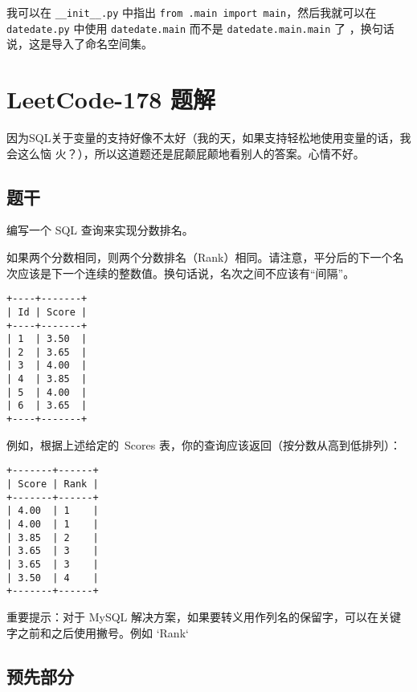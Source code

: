 我可以在 \verb|__init__.py| 中指出 \verb|from .main import main|，然后我就可以在 %
\verb|datedate.py| 中使用 \verb|datedate.main| 而不是 \verb|datedate.main.main| 了
，换句话说，这是导入了命名空间集。


\section{LeetCode-178 题解}

因为SQL关于变量的支持好像不太好（我的天，如果支持轻松地使用变量的话，我会这么恼
火？），所以这道题还是屁颠屁颠地看别人的答案。心情不好。

\subsection{题干}

编写一个 SQL 查询来实现分数排名。

如果两个分数相同，则两个分数排名（Rank）相同。请注意，平分后的下一个名次应该是下一个连续的整数值。换句话说，名次之间不应该有“间隔”。
\begin{lstlisting}
+----+-------+
| Id | Score |
+----+-------+
| 1  | 3.50  |
| 2  | 3.65  |
| 3  | 4.00  |
| 4  | 3.85  |
| 5  | 4.00  |
| 6  | 3.65  |
+----+-------+
\end{lstlisting}

例如，根据上述给定的 Scores 表，你的查询应该返回（按分数从高到低排列）：
\begin{lstlisting}
+-------+------+
| Score | Rank |
+-------+------+
| 4.00  | 1    |
| 4.00  | 1    |
| 3.85  | 2    |
| 3.65  | 3    |
| 3.65  | 3    |
| 3.50  | 4    |
+-------+------+
\end{lstlisting}

重要提示：对于 MySQL 解决方案，如果要转义用作列名的保留字，可以在关键字之前和之后使用撇号。例如 `Rank`

\subsection{预先部分}

